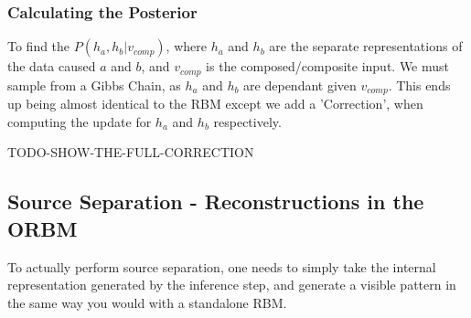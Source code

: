 \begin{itemize}
\begin{itemize}
  \end{itemize}


  \subsubsection{Calculating the Posterior}

  To find the $ P(h_a, h_b | v_{comp}) $, where $h_a$ and $h_b$ are the separate representations of the data caused $a$ and $b$, and $v_{comp}$ is the composed/composite input. We must sample from a Gibbs Chain,  as $h_a$ and $h_b$ are dependant given $v_{comp}$. This ends up being almost identical to the RBM except we add a 'Correction', when computing the update for $h_a$ and $h_b$ respectively.

  TODO-SHOW-THE-FULL-CORRECTION

  \subsection{Source Separation - Reconstructions in the ORBM}

  To actually perform source separation, one needs to simply take the internal representation generated by the inference step, and generate a visible pattern in the same way you would with a standalone RBM.
